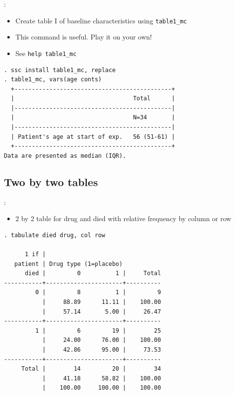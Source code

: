 \begin{frame}[fragile]{\secname: \subsecname}
\begin{itemize}
\item Create table I of baseline characteristics using \verb|table1_mc|
\item This command is useful. Play it on your own!
\item See \verb|help table1_mc|
\end{itemize}
\scriptsize
\begin{verbatim}
. ssc install table1_mc, replace
. table1_mc, vars(age conts)
  +---------------------------------------------+
  |                                  Total      |
  |---------------------------------------------|
  |                                  N=34       |
  |---------------------------------------------|
  | Patient's age at start of exp.   56 (51-61) |
  +---------------------------------------------+
Data are presented as median (IQR).
\end{verbatim}
\end{frame}	

\subsection{Two by two tables}
\begin{frame}[fragile]{\secname: \subsecname}
\begin{itemize}
\item 2 by 2 table for drug and died with relative frequency by column or row
\end{itemize}
\scriptsize
\begin{verbatim}
. tabulate died drug, col row

      1 if |
   patient | Drug type (1=placebo)
      died |         0          1 |     Total
-----------+----------------------+----------
         0 |         8          1 |         9 
           |     88.89      11.11 |    100.00 
           |     57.14       5.00 |     26.47 
-----------+----------------------+----------
         1 |         6         19 |        25 
           |     24.00      76.00 |    100.00 
           |     42.86      95.00 |     73.53 
-----------+----------------------+----------
     Total |        14         20 |        34 
           |     41.18      58.82 |    100.00 
           |    100.00     100.00 |    100.00 
	
\end{verbatim}
\end{frame}	

